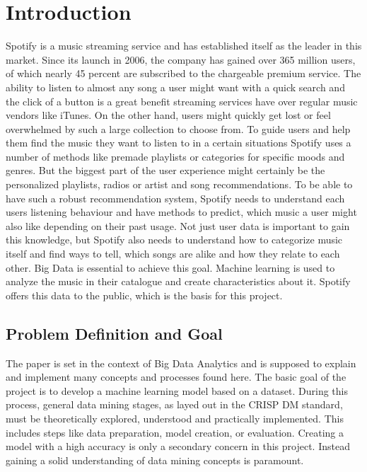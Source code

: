 \section{Introduction}

Spotify is a music streaming service and has established itself as the leader in this
market. Since its launch in 2006, the company has gained over 365 million users, of
which nearly 45 percent are subscribed to the chargeable premium service.
The ability to listen to almost any song a user might want with a quick search and
the click of a button is a great benefit streaming services have over regular music vendors
like iTunes. On the other hand, users might quickly get lost or feel overwhelmed by such
a large collection to choose from.
To guide users and help them find the music they want to listen to in a certain situations
Spotify uses a number of methods like premade playlists or categories for specific moods and
genres. But the biggest part of the user experience might certainly be the personalized
playlists, radios or artist and song recommendations.
To be able to have such a robust recommendation system, Spotify needs to understand each users
listening behaviour and have methods to predict, which music a user might also like depending
on their past usage.
Not just user data is important to gain this knowledge, but Spotify also needs to understand
how to categorize music itself and find ways to tell, which songs are alike and how they
relate to each other.
Big Data is essential to achieve this goal. Machine learning is used 
to analyze the music in their catalogue and create characteristics about it.
Spotify offers this data to the public, which is the basis for this project.

\subsection{Problem Definition and Goal}

The paper is set in the context of Big Data Analytics and is supposed to explain and implement
many concepts and processes found here.
The basic goal of the project is to develop a machine learning model based on a dataset.
During this process, general data mining stages, as layed out in the \ac{CRISP DM} standard,
must be theoretically explored, understood and practically implemented. This includes steps like data
preparation, model creation, or evaluation. Creating a model with a high accuracy is only a secondary
concern in this project. Instead gaining a solid understanding of data mining concepts is paramount.

